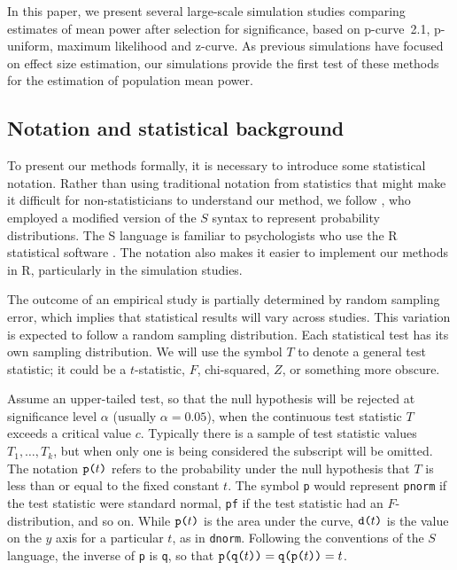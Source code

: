 \documentclass[jou]{apa6} %
\newcommand{\R}[1]{\mbox{\texttt{#1}}} %
\begin{document}
In this paper, we present several large-scale simulation studies comparing estimates of mean power after selection for significance, based on p-curve~2.1, p-uniform, maximum likelihood and z-curve. As previous simulations have focused on effect size estimation, our simulations provide the first test of these methods for the estimation of population mean power.  

\subsection{Notation and statistical background} 

To present our methods formally, it is necessary to introduce some statistical notation. Rather than using traditional notation from statistics that might make it difficult for non-statisticians to understand our method, we follow
\textcite{SimonsohnEtAl2014a}, 
who employed a modified version of the $S$ syntax \parencite{BeckerEtAl1988}
to represent probability distributions. The S language is familiar to psychologists who use the R statistical software \parencite{RcoreTeam2012}.
The notation also makes it easier to implement our methods in R, particularly in the simulation studies. 

The outcome of an empirical study is partially determined by random sampling error, which implies that statistical results will vary across studies. This variation is expected to follow a random sampling distribution. Each statistical test has its own sampling distribution. We will use the symbol $T$ to denote a general test statistic; it could be a $t$-statistic, $F$, chi-squared, $Z$, or something more obscure.

Assume an upper-tailed test, so that the null hypothesis will be rejected at significance level $\alpha$ (usually $\alpha = 0.05$), when the continuous test statistic $T$ exceeds a critical value $c$. Typically there is a sample of test statistic values $T_1, \ldots, T_k$, but when only one is being considered the subscript will be omitted. The notation $\R{p(}t\R{)}$ refers to the probability under the null hypothesis that $T$ is less than or equal to the fixed constant $t$. The symbol \texttt{p} would represent \texttt{pnorm} if the test statistic were standard normal, \texttt{pf} if the test statistic had an $F$-distribution, and so on. While $\R{p(}t\R{)}$ is the area under the curve, $\R{d(}t\R{)}$ is the value on the $y$ axis for a particular $t$, as in \texttt{dnorm}. Following the conventions of the $S$ language, the inverse of \texttt{p} is \texttt{q}, so that $\R{p(q(}t\R{))} = \R{q(p(}t\R{))} = t$. 
\end{document}
